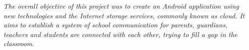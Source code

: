 %
%
%
%

\newpage  %
\begin{summary}
	{\em
		The overall objective of this project was to create an \textit{Android} application using new technologies and the Internet storage services, commonly known as cloud. It aims to establish a system of school communication for parents, guardians, teachers and students are connected with each other, trying to fill a gap in the classroom.
	}
\end{summary}
